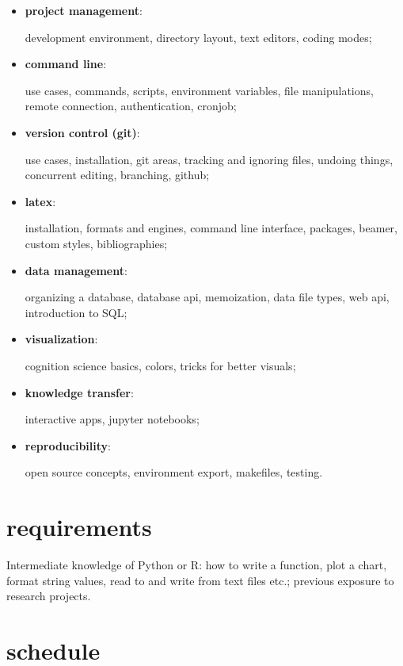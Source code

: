 \documentclass[12pt]{article}
\begin{document}
\begin{itemize}[topsep=0pt, itemsep=4pt, partopsep=0pt, parsep=0pt]
    \item \textbf{project management}:\par
        development environment, directory layout, text editors, coding modes;
    \item \textbf{command line}:\par
        use cases, commands, scripts, environment variables, file manipulations, remote connection, authentication, cronjob;
    \item \textbf{version control (git)}:\par
        use cases, installation, git areas, tracking and ignoring files, undoing things, concurrent editing, branching, github;
    \item \textbf{latex}:\par
        installation, formats and engines, command line interface, packages, beamer, custom styles, bibliographies;
    \item \textbf{data management}:\par
        organizing a database, database api, memoization, data file types, web api, introduction to SQL;
    \item \textbf{visualization}:\par
        cognition science basics, colors, tricks for better visuals;
    \item \textbf{knowledge transfer}:\par
        interactive apps, jupyter notebooks;
    \item \textbf{reproducibility}:\par
        open source concepts, environment export, makefiles, testing.
\end{itemize}


\section{requirements} %
\label{sec:requirements}

Intermediate knowledge of Python or R: how to write a function, plot a chart, format string values, read to and write from text files etc.; previous exposure to research projects.


\section{schedule} %
\label{sec:schedule}
\end{document}
